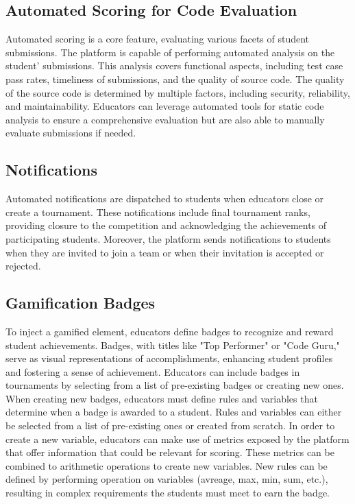 \subsection*{Automated Scoring for Code Evaluation}
Automated scoring is a core feature, evaluating various facets of student submissions. 
The platform is capable of performing automated analysis on the student' submissions.
This analysis covers functional aspects, including test case pass rates, timeliness of submissions, and the quality of source code.
The quality of the source code is determined by multiple factors, including security, reliability, and maintainability.
Educators can leverage automated tools for static code analysis to ensure a comprehensive evaluation but are also able to manually evaluate submissions if needed.

\subsection*{Notifications}
Automated notifications are dispatched to students when educators close or create a tournament. 
These notifications include final tournament ranks, providing closure to the competition and acknowledging the achievements of participating students.
Moreover, the platform sends notifications to students when they are invited to join a team or when their invitation is accepted or rejected.

\subsection*{Gamification Badges}
To inject a gamified element, educators define badges to recognize and reward student achievements. 
Badges, with titles like "Top Performer" or "Code Guru," serve as visual representations of accomplishments, enhancing student profiles and fostering a sense of achievement.
Educators can include badges in tournaments by selecting from a list of pre-existing badges or creating new ones.
When creating new badges, educators must define rules and variables that determine when a badge is awarded to a student.
Rules and variables can either be selected from a list of pre-existing ones or created from scratch.
In order to create a new variable, educators can make use of metrics exposed by the platform that offer information that could be relevant for scoring. 
These metrics can be combined to arithmetic operations to create new variables.
New rules can be defined by performing operation on variables (avreage, max, min, sum, etc.), resulting in complex requirements the students must meet to earn the badge.



